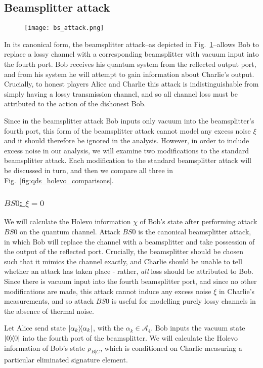 \subsection{Beamsplitter attack}

\begin{figure}[htp]
\centering
\texttt{[image: bs\_attack.png]}
\caption{\label{fig:bs0_attack}}
\end{figure}
In its canonical form, the beamsplitter attack--as depicted in Fig.~\ref{fig:bs0_attack}--allows Bob to replace a lossy channel with a corresponding beamsplitter with vacuum input into the fourth port. Bob receives his quantum system from the reflected output port, and from his system he will attempt to gain information about Charlie's output. Crucially, to honest players Alice and Charlie this attack is indistinguishable from simply having a lossy transmission channel, and so all channel loss must be attributed to the action of the dishonest Bob. 

Since in the beamsplitter attack Bob inputs only vacuum into the beamsplitter's fourth port, this form of the beamsplitter attack cannot model any excess noise $\xi$ and it should therefore be ignored in the analysis. However, in order to include excess noise in our analysis, we will examine two modifications to the standard beamsplitter attack. Each modification to the standard beamsplitter attack will be discussed in turn, and then we compare all three in Fig.~\ref{fig:qds_holevo_comparisons}. 

\subsubsection{\underline{$BS0$: $\xi = 0$}}
We will calculate the Holevo information $\chi$ of Bob's state after performing attack $BS0$ on the quantum channel. Attack $BS0$ is the canonical beamsplitter attack, in which Bob will replace the channel with a beamsplitter and take possession of the output of the reflected port. Crucially, the beamsplitter should be chosen such that it mimics the channel exactly, and Charlie should be unable to tell whether an attack has taken place - rather, \emph{all} loss should be attributed to Bob. Since there is vacuum input into the fourth beamsplitter port, and since no other modifications are made, this attack cannot induce any excess noise $\xi$ in Charlie's measurements, and so attack $BS0$ is useful for modelling purely lossy channels in the absence of thermal noise.

Let Alice send state $\dyad{\alpha_k}$, with the $\alpha_k \in \mathcal{A}_4$. Bob inputs the vacuum state $\dyad{0}$ into the fourth port of the beamsplitter. We will calculate the Holevo information of Bob's state $\rho_{B | C}$, which is conditioned on Charlie measuring a particular eliminated signature element.

